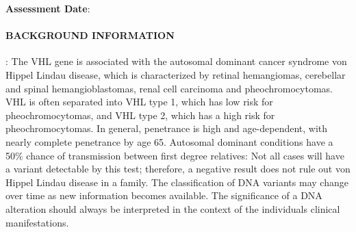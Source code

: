 \documentclass[10pt]{extarticle}
\newcommand{\data}[1]{}
\begin{document}
{\bf Assessment Date}: \data{date_verified}

\hdashrule[0.5ex]{\textwidth}{1pt}{1mm}

\paragraph{BACKGROUND INFORMATION}: The VHL gene is associated with the autosomal dominant cancer syndrome von Hippel Lindau disease, which is characterized by retinal hemangiomas, cerebellar and spinal hemangioblastomas, renal cell carcinoma and pheochromocytomas. VHL is often separated into VHL type 1, which has low risk for pheochromocytomas, and VHL type 2, which has a high risk for pheochromocytomas. In general, penetrance is high and age-dependent, with nearly complete penetrance by age 65. Autosomal dominant conditions have a 50\% chance of transmission between first degree relatives: Not all cases will have a variant detectable by this test; therefore, a negative result does not rule out von Hippel Lindau disease in a family. The classification of DNA variants may change over time as new information becomes available. The significance of a DNA alteration should always be interpreted in the context of the individuals clinical manifestations.
\end{document}
